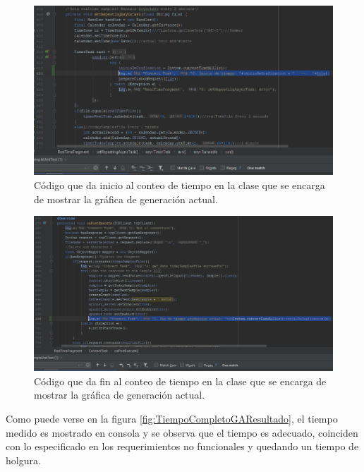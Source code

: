 \begin{figure}[H]
	\centering
	\includegraphics[scale=.6]{Capitulo5/images/TiempoCompletoCodigoInicio.png}
	\caption{Código que da inicio al conteo de tiempo en la clase que se encarga de mostrar la gráfica de generación actual.}	\label{fig:TiempoCompletoGAInicio}
\end{figure} 

\begin{figure}[H]
	\centering
	\includegraphics[scale=.5]{Capitulo5/images/TiempoCompletoCodigoFin.png}
	\caption{Código que da fin al conteo de tiempo en la clase que se encarga de mostrar la gráfica de generación actual.}	\label{fig:TiempoCompletoGAFin}
\end{figure} 

Como puede verse en la figura \ref{fig:TiempoCompletoGAResultado}, el tiempo medido es mostrado en consola y se observa que el tiempo es adecuado, coinciden con lo especificado en los requerimientos no funcionales y quedando un tiempo de holgura.\\ \newline

